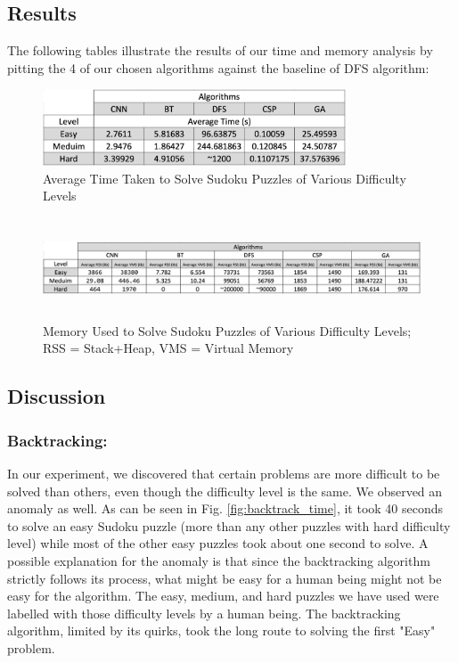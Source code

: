 \subsection{Results}

The following tables illustrate the results of our time and memory analysis by pitting the 4 of our chosen algorithms against the baseline of DFS algorithm:

\begin{figure} [htbp]
\centering
\includegraphics[width=90mm,scale=1]{figures/time-taken.png}
\caption{Average Time Taken to Solve Sudoku Puzzles of Various Difficulty Levels}
\label{fig:time_eval}
\end{figure}

\begin{figure} [htbp]
\centering
\includegraphics[width=120mm,height=30mm]{figures/memory-used.png}
\caption{Memory Used to Solve Sudoku Puzzles of Various Difficulty Levels; \centering RSS = Stack+Heap, VMS = Virtual Memory}
\label{fig:memory_eval}
\end{figure}

\subsection{Discussion}

\subsubsection{Backtracking:}
In our experiment, we discovered that certain problems are more difficult to be solved than others, even though the difficulty level is the same. We observed an anomaly as well. As can be seen in Fig. \ref{fig:backtrack_time}, it took 40 seconds to solve an easy Sudoku puzzle (more than any other puzzles with hard difficulty level) while most of the other easy puzzles took about one second to solve. A possible explanation for the anomaly is that since the backtracking algorithm strictly follows its process, what might be easy for a human being might not be easy for the algorithm. The easy, medium, and hard puzzles we have used were labelled with those difficulty levels by a human being. The backtracking algorithm, limited by its quirks, took the long route to solving the first "Easy" problem.

